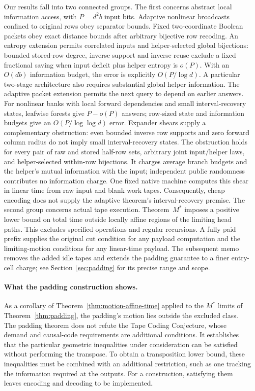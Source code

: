 Our results fall into two connected groups. The first concerns abstract local
information access, with $P=d^2b$ input bits. Adaptive nonlinear broadcasts confined to original rows
obey separator bounds. Fixed two-coordinate Boolean packets obey exact distance
bounds after arbitrary bijective row recoding. An entropy extension permits
correlated inputs and helper-selected global bijections: bounded stored-row
degree, inverse support and inverse reuse exclude a fixed fractional saving
when input deficit plus helper entropy is $o(P)$. With an $O(db)$ information
budget, the error is explicitly $O(P/\log d)$. A particular two-stage
architecture also requires substantial global helper information.
The adaptive packet extension permits the next query to depend on earlier
answers. For nonlinear banks with local forward dependencies and small
interval-recovery states, leafwise forests give $P-o(P)$ answers; row-sized
state and information budgets give an $O(P/\log\log d)$ error.
Expander shears supply a complementary obstruction: even bounded inverse row
supports and zero forward column radius do not imply small interval-recovery
states. The obstruction holds for every pair of raw and stored half-row sets,
arbitrary joint input/helper laws, and helper-selected within-row bijections.
It charges average branch budgets and the helper's mutual information with
the input; independent public randomness contributes no information charge.
One fixed native machine computes this shear in linear time from raw input
and blank work tapes. Consequently, cheap encoding does not supply the
adaptive theorem's interval-recovery premise.
The second group concerns actual tape execution. Theorem~$M^*$ imposes a positive lower bound on total time
outside locally affine regions of the limiting head paths. This excludes
specified operations and regular recursions. A fully paid prefix supplies the
original cut condition for any payload computation and the limiting-motion conditions
for any linear-time payload.
The subsequent memo~\cite{PaddingMemo2026} removes the added idle tapes and
extends the padding guarantee to a finer entry-cell charge; see
Section~\ref{sec:padding} for its precise range and scope.

\paragraph{What the padding construction shows.}
As a corollary of Theorem~\ref{thm:motion-affine-time} applied to the $M^*$
limits of Theorem~\ref{thm:padding}, the padding's motion lies outside the
excluded class. The padding theorem does not refute the Tape Coding
Conjecture, whose demand and causal-code requirements are additional
conditions. It establishes that the particular geometric inequalities under
consideration can be satisfied without performing the transpose. To obtain a
transposition lower bound, these inequalities must be combined
with an additional restriction, such as one tracking the information required
at the outputs. For a construction, satisfying them leaves encoding and
decoding to be implemented.

